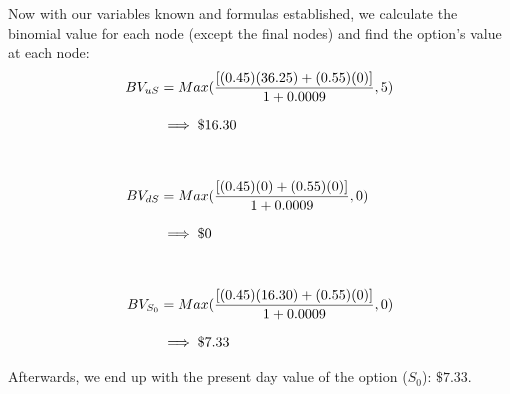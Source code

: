 \documentclass[12pt, letterpaper]{article}
\begin{document}
Now with our variables known and formulas established, we calculate the binomial value for each node (except the final nodes) and find the option's value at each node:
\begin{equation*}
  \setlength{\jot}{10pt}
  \begin{split}
    BV_{uS}
    & = Max(\frac{[(0.45)(36.25) + (0.55)(0)]}{1+0.0009}, 5)
    \\
    & \implies \$16.30
    \\
    \\
    BV_{dS}
    & = Max(\frac{[(0.45)(0) + (0.55)(0)]}{1+0.0009}, 0)
    \\
    & \implies \$0
    \\
    \\
    BV_{S_0}
    & = Max(\frac{[(0.45)(16.30) + (0.55)(0)]}{1+0.0009}, 0)
    \\
    & \implies \$7.33
  \end{split}
\end{equation*}

Afterwards, we end up with the present day value of the option (${S_0}$): ${\$7.33}$.

\pagebreak
\end{document}
